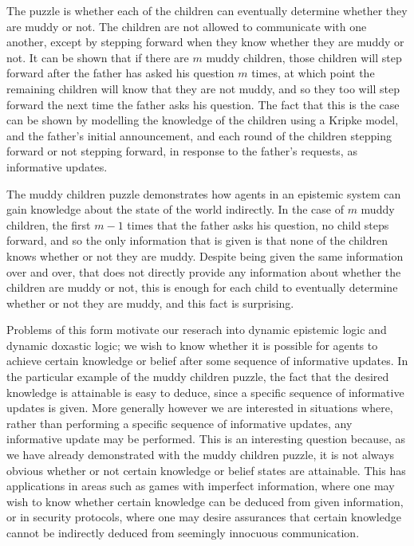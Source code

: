 The puzzle is whether each of the children can eventually determine whether
they are muddy or not. The children are not allowed to communicate with one
another, except by stepping forward when they know whether they are muddy or
not. It can be shown that if there are $m$ muddy children, those children will
step forward after the father has asked his question $m$ times, at which point
the remaining children will know that they are not muddy, and so they too will
step forward the next time the father asks his question. The fact that this is
the case can be shown by modelling the knowledge of the children using a Kripke
model, and the father's initial announcement, and each round of the children
stepping forward or not stepping forward, in response to the father's requests,
as informative updates.

The muddy children puzzle demonstrates how agents in an epistemic system can
gain knowledge about the state of the world indirectly. In the case of $m$ muddy
children, the first $m - 1$ times that the father asks his question, no child
steps forward, and so the only information that is given is that none of the
children knows whether or not they are muddy. Despite being given the same
information over and over, that does not directly provide any information about
whether the children are muddy or not, this is enough for each child to
eventually determine whether or not they are muddy, and this fact is surprising.

Problems of this form motivate our reserach into dynamic epistemic logic and
dynamic doxastic logic; we wish to know whether it is possible for agents to
achieve certain knowledge or belief after some sequence of informative updates.
In the particular example of the muddy children puzzle, the fact that the
desired knowledge is attainable is easy to deduce, since a specific sequence of
informative updates is given.  More generally however we are interested in
situations where, rather than performing a specific sequence of informative
updates, any informative update may be performed.  This is an interesting
question because, as we have already demonstrated with the muddy children
puzzle, it is not always obvious whether or not certain knowledge or belief
states are attainable. This has applications in areas such as games with
imperfect information, where one may wish to know whether certain knowledge can
be deduced from given information, or in security protocols, where one may
desire assurances that certain knowledge cannot be indirectly deduced from
seemingly innocuous communication.

